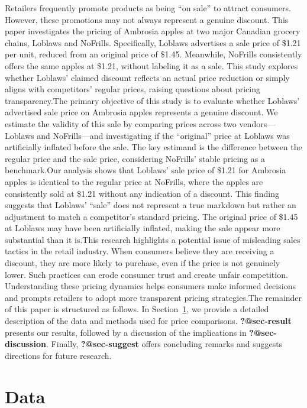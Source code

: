 \documentclass[
  letterpaper,
  DIV=11,
  numbers=noendperiod]{scrartcl}
\begin{document}
Retailers frequently promote products as being ``on sale'' to attract
consumers. However, these promotions may not always represent a genuine
discount. This paper investigates the pricing of Ambrosia apples at two
major Canadian grocery chains, Loblaws and NoFrills. Specifically,
Loblaws advertises a sale price of \$1.21 per unit, reduced from an
original price of \$1.45. Meanwhile, NoFrills consistently offers the
same apples at \$1.21, without labeling it as a sale. This study
explores whether Loblaws' claimed discount reflects an actual price
reduction or simply aligns with competitors' regular prices, raising
questions about pricing transparency.The primary objective of this study
is to evaluate whether Loblaws' advertised sale price on Ambrosia apples
represents a genuine discount. We estimate the validity of this sale by
comparing prices across two vendors---Loblaws and NoFrills---and
investigating if the ``original'' price at Loblaws was artificially
inflated before the sale. The key estimand is the difference between the
regular price and the sale price, considering NoFrills' stable pricing
as a benchmark.Our analysis shows that Loblaws' sale price of \$1.21 for
Ambrosia apples is identical to the regular price at NoFrills, where the
apples are consistently sold at \$1.21 without any indication of a
discount. This finding suggests that Loblaws' ``sale'' does not
represent a true markdown but rather an adjustment to match a
competitor's standard pricing. The original price of \$1.45 at Loblaws
may have been artificially inflated, making the sale appear more
substantial than it is.This research highlights a potential issue of
misleading sales tactics in the retail industry. When consumers believe
they are receiving a discount, they are more likely to purchase, even if
the price is not genuinely lower. Such practices can erode consumer
trust and create unfair competition. Understanding these pricing
dynamics helps consumers make informed decisions and prompts retailers
to adopt more transparent pricing strategies.The remainder of this paper
is structured as follows. In Section~\ref{sec-data}, we provide a
detailed description of the data and methods used for price comparisons.
\textbf{?@sec-result} presents our results, followed by a discussion of
the implications in \textbf{?@sec-discussion}. Finally,
\textbf{?@sec-suggest} offers concluding remarks and suggests directions
for future research.

\section{Data}\label{sec-data}
\end{document}
